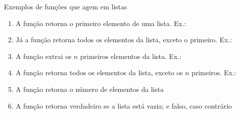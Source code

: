 \begin{frame}[fragile]{Exemplos de funções que agem em listas}

    \begin{enumerate}
        \item A função  retorna o primeiro elemento de uma lista. Ex.:


        \item Já a função  retorna todos os elementos da lista, exceto o
            primeiro. Ex.:


        \item A função  extrai os $n$ primeiros elementos da lista. Ex.:


        \item A função  retorna todos os elementos da lista, exceto os $n$ primeiros. Ex.:


        \item A função  retorna o número de elementos da lista


        \item A função  retorna verdadeiro se a lista está vazia; e falso,
            caso contrário
    \end{enumerate}

\end{frame}

